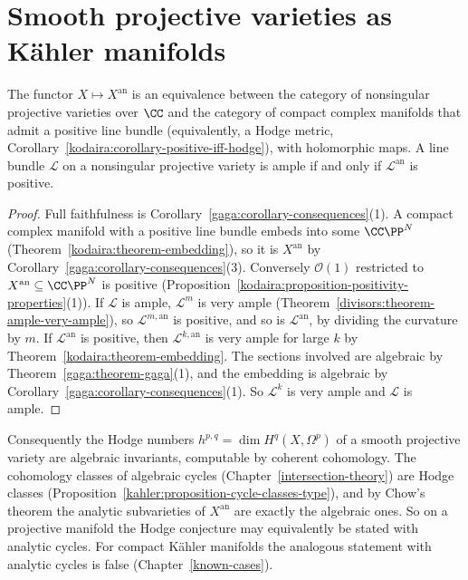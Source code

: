 \section{Smooth projective varieties as K\"ahler manifolds}\label{gaga:section-kahler}

\begin{theorem}\label{gaga:theorem-projective-kahler}
The functor $X \mapsto X^{\mathrm{an}}$ is an equivalence between the category of nonsingular projective varieties over $\CC$ and the category of compact complex manifolds that
admit a positive line bundle (equivalently, a Hodge metric, Corollary~\ref{kodaira:corollary-positive-iff-hodge}), with holomorphic maps. A line bundle $\mathcal{L}$ on a
nonsingular projective variety is ample if and only if $\mathcal{L}^{\mathrm{an}}$ is positive.
\end{theorem}

\begin{proof}
Full faithfulness is Corollary~\ref{gaga:corollary-consequences}(1). A compact complex manifold with a positive line bundle embeds into some $\CC\PP^N$
(Theorem~\ref{kodaira:theorem-embedding}), so it is $X^{\mathrm{an}}$ by Corollary~\ref{gaga:corollary-consequences}(3). Conversely $\mathcal{O}(1)$ restricted to
$X^{\mathrm{an}} \subseteq \CC\PP^N$ is positive (Proposition~\ref{kodaira:proposition-positivity-properties}(1)). If $\mathcal{L}$ is ample, $\mathcal{L}^m$ is very ample
(Theorem~\ref{divisors:theorem-ample-very-ample}), so $\mathcal{L}^{m,\mathrm{an}}$ is positive, and so is $\mathcal{L}^{\mathrm{an}}$, by dividing the curvature by $m$. If
$\mathcal{L}^{\mathrm{an}}$ is positive, then $\mathcal{L}^{k,\mathrm{an}}$ is very ample for large $k$ by Theorem~\ref{kodaira:theorem-embedding}. The sections involved are
algebraic by Theorem~\ref{gaga:theorem-gaga}(1), and the embedding is algebraic by Corollary~\ref{gaga:corollary-consequences}(1). So $\mathcal{L}^k$ is very ample and
$\mathcal{L}$ is ample.
\end{proof}

\begin{remark}\label{gaga:remark-algebraic-invariants}
Consequently the Hodge numbers $h^{p,q} = \dim H^q(X, \Omega^p)$ of a smooth projective variety are algebraic invariants, computable by coherent cohomology. The cohomology
classes of algebraic cycles (Chapter~\ref{intersection-theory}) are Hodge classes (Proposition~\ref{kahler:proposition-cycle-classes-type}), and by Chow's theorem
the analytic subvarieties of $X^{\mathrm{an}}$ are exactly the algebraic ones. So on a projective manifold the Hodge conjecture may equivalently be stated with analytic
cycles. For compact K\"ahler manifolds the analogous statement with analytic cycles is false (Chapter~\ref{known-cases}).
\end{remark}

